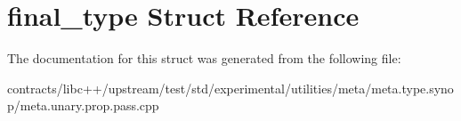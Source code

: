 \hypertarget{structfinal__type}{}\section{final\+\_\+type Struct Reference}
\label{structfinal__type}


The documentation for this struct was generated from the following file\+:\begin{DoxyCompactItemize}
\item 
contracts/libc++/upstream/test/std/experimental/utilities/meta/meta.\+type.\+synop/meta.\+unary.\+prop.\+pass.\+cpp\end{DoxyCompactItemize}
